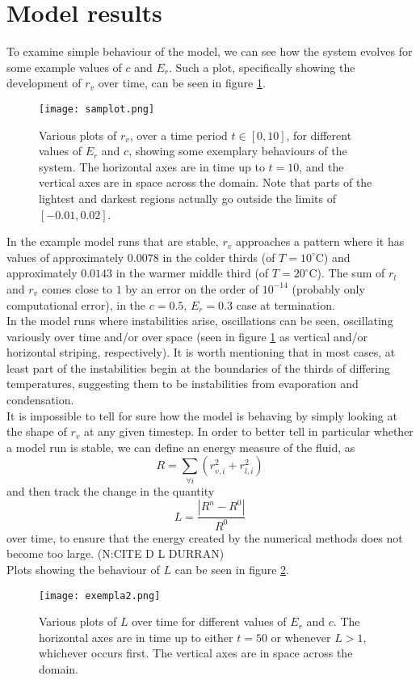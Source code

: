\documentclass[11pt]{article}
\begin{document}
\section{Model results}
To examine simple behaviour of the model, we can see how the system evolves for some example values of $c$ and $E_r$. Such a plot, specifically showing the development of $r_v$ over time, can be seen in figure \ref{fig:samplot}.
\begin{figure}[H]
\centering
\texttt{[image: samplot.png]}
\caption{Various plots of $r_v$, over a time period $t\in[0,10]$, for different values of $E_r$ and $c$, showing some exemplary behaviours of the system. The horizontal axes are in time up to $t=10$, and the vertical axes are in space across the domain. Note that parts of the lightest and darkest regions actually go outside the limits of $[-0.01,0.02]$.}
\label{fig:samplot}
\end{figure}
In the example model runs that are stable, $r_v$ approaches a pattern where it has values of approximately $0.0078$ in the colder thirds (of $T=10^{\circ}$C) and approximately $0.0143$ in the warmer middle third (of $T=20^{\circ}$C). The sum of $r_l$ and $r_v$ comes close to $1$ by an error on the order of $10^{-14}$ (probably only computational error), in the $c=0.5$, $E_r=0.3$ case at termination. \\
In the model runs where instabilities arise, oscillations can be seen, oscillating variously over time and/or over space (seen in figure \ref{fig:samplot} as vertical and/or horizontal striping, respectively). It is worth mentioning that in most cases, at least part of the instabilities begin at the boundaries of the thirds of differing temperatures, suggesting them to be instabilities from evaporation and condensation. \\
It is impossible to tell for sure how the model is behaving by simply looking at the shape of $r_v$ at any given timestep. In order to better tell in particular whether a model run is stable, we can define an energy measure of the fluid, as
\[
R = \sum_{\forall i}\left(r_{v,i}^2+r_{l,i}^2\right)
\]
and then track the change in the quantity
\[
L = \frac{\left|R^n - R^0\right|}{R^0}
\]
over time, to ensure that the energy created by the numerical methods does not become too large. (N:CITE D L DURRAN) \\
Plots showing the behaviour of $L$ can be seen in figure \ref{fig:exempla2}.
\begin{figure}[H]
\centering
\texttt{[image: exempla2.png]}
\caption{Various plots of $L$ over time for different values of $E_r$ and $c$. The horizontal axes are in time up to either $t=50$ or whenever $L>1$, whichever occurs first. The vertical axes are in space across the domain.}
\label{fig:exempla2}
\end{figure}
\end{document}
